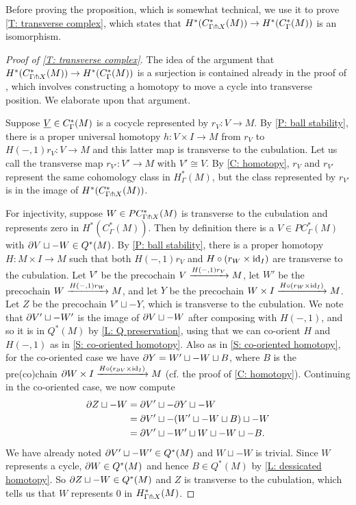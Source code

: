 Before proving the proposition, which is somewhat technical, we use it to prove \cref{T: transverse complex}, which states that $H^*(C^*_{\Gamma \pitchfork X}(M)) \to H^*(C_\Gamma^*(M))$ is an isomorphism.

\begin{proof}[Proof of \cref{T: transverse complex}]
	The idea of the argument that $H^*(C^*_{\Gamma \pitchfork X}(M)) \to H^*(C_\Gamma^*(M))$ is a surjection is contained already in the proof of \cite[Lemma 15]{Lipy14}, which involves constructing a homotopy to move a cycle into transverse position.
	We elaborate upon that argument.

	Suppose $\underline{V} \in C_\Gamma^*(M)$ is a cocycle represented by $r_V \colon V \to M$.
	By \cref{P: ball stability}, there is a proper universal homotopy $h \colon V \times I \to M$ from $r_V$ to $H(-,1)r_{V} \colon V \to M$ and this latter map is transverse to the cubulation.
	Let us call the transverse map $r_{V'} \colon V' \to M$ with $V' \cong V$.
	By \cref{C: homotopy}, $r_V$ and $r_{V'}$ represent the same cohomology class in $H^*_{\Gamma}(M)$, but the class represented by $r_{V'}$ is in the image of $H^*(C^*_{\Gamma \pitchfork X}(M))$.

	For injectivity, suppose $W \in PC^*_{\Gamma \pitchfork X}(M)$ is transverse to the cubulation and represents zero in $H^*(C_\Gamma^*(M))$.
	Then by definition there is a $V \in PC^*_\Gamma(M)$ with $\partial V \sqcup -W \in Q^*(M)$.
	By \cref{P: ball stability}, there is a proper homotopy $H \colon M \times I \to M$ such that both $H(-,1)r_V$ and $H\circ (r_W \times \mathrm{id}_I)$ are transverse to the cubulation.
	Let $V'$ be the precochain $V \xrightarrow{H(-,1)r_V} M$, let $W'$ be the precochain $W \xrightarrow{H(-,1)r_W} M$, and let $Y$ be the precochain $W \times I \xrightarrow{H\circ (r_W \times \mathrm{id}_I)} M$.
	Let $Z$ be the precochain $V' \sqcup -Y$, which is transverse to the cubulation.
	We note that $\partial V' \sqcup -W'$ is the image of $\partial V \sqcup -W$ after composing with $H(-,1)$, and so it is in $Q^*(M)$ by \cref{L: Q preservation}, using that we can co-orient $H$ and $H(-,1)$ as in \cref{S: co-oriented homotopy}.
	Also as in \cref{S: co-oriented homotopy}, for the co-oriented case we have $\partial Y = W' \sqcup -W \sqcup B$, where $B$ is the pre(co)chain $\partial W \times I \xrightarrow{H\circ (r_{\partial V} \times \mathrm{id}_I)} M$ (cf. the proof of \cref{C: homotopy}).
	Continuing in the co-oriented case, we now compute
	\begin{align*}
		\partial Z \sqcup -W &= \partial V' \sqcup -\partial Y \sqcup -W\\
		&= \partial V' \sqcup -(W' \sqcup -W \sqcup B) \sqcup -W\\
		&= \partial V' \sqcup -W' \sqcup W \sqcup -W \sqcup -B.
	\end{align*}
	We have already noted $\partial V' \sqcup -W' \in Q^*(M)$ and $W \sqcup -W$ is trivial.
	Since $W$ represents a cycle, $\partial W \in Q^*(M)$ and hence $B \in Q^*(M)$ by \cref{L: dessicated homotopy}.
	So $\partial Z \sqcup -W \in Q^*(M)$ and $Z$ is transverse to the cubulation, which tells us that $W$ represents $0$ in $H^*_{\Gamma \pitchfork X}(M)$.
\end{proof}


